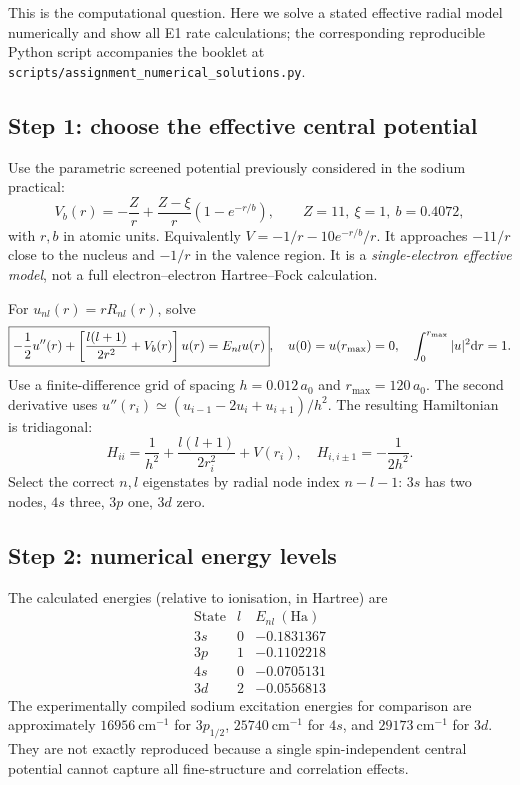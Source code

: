 This is the computational question. Here we solve
a stated effective radial model numerically and
show all E1 rate calculations; the corresponding
reproducible Python script accompanies the booklet
at \texttt{scripts/assignment\_numerical\_solutions.py}.

\subsection*{Step 1: choose the effective central potential}
Use the parametric screened potential previously
considered in the sodium practical:
\[
\boxed{V_b(r)=-\frac Zr+
\frac{Z-\xi}{r}(1-e^{-r/b}),\qquad
Z=11,\ \xi=1,\ b=0.4072},
\]
with \(r,b\) in atomic units. Equivalently
\(V=-1/r-10e^{-r/b}/r\).
It approaches \(-11/r\) close to the nucleus
and \(-1/r\) in the valence region.
It is a \emph{single-electron effective model},
not a full electron--electron Hartree--Fock
calculation.

For \(u_{nl}(r)=rR_{nl}(r)\), solve
\[
\boxed{-\frac12u''(r)+
\left[\frac{l(l+1)}{2r^2}+V_b(r)\right]u(r)
=E_{nl}u(r)},
\quad
u(0)=u(r_{\max})=0,\quad
\int_0^{r_{\max}}|u|^2\mathrm{d} r=1.
\]
Use a finite-difference grid of spacing
\(h=0.012\,a_0\) and \(r_{\max}=120\,a_0\).
The second derivative uses
\(u''(r_i)\simeq(u_{i-1}-2u_i+u_{i+1})/h^2\).
The resulting Hamiltonian is tridiagonal:
\[
H_{ii}=\frac1{h^2}+\frac{l(l+1)}{2r_i^2}+V(r_i),
\quad H_{i,i\pm1}=-\frac1{2h^2}.
\]
Select the correct \(n,l\) eigenstates by
radial node index \(n-l-1\): \(3s\) has two
nodes, \(4s\) three, \(3p\) one, \(3d\) zero.

\subsection*{Step 2: numerical energy levels}
The calculated energies (relative to
ionisation, in Hartree) are
\[
\begin{array}{c|r|r}
\text{State}&l&E_{nl}\ (\mathrm{Ha})\\\hline
3s&0&-0.1831367\\
3p&1&-0.1102218\\
4s&0&-0.0705131\\
3d&2&-0.0556813
\end{array}
\]
The experimentally compiled sodium excitation
energies for comparison are approximately
\(16956\ \mathrm{cm}^{-1}\) for \(3p_{1/2}\),
\(25740\ \mathrm{cm}^{-1}\) for \(4s\), and
\(29173\ \mathrm{cm}^{-1}\) for \(3d\).
They are not exactly reproduced because
a single spin-independent central potential
cannot capture all fine-structure and
correlation effects.

